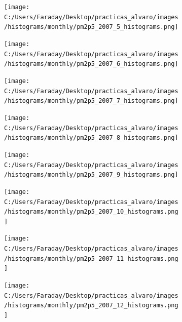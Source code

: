 \documentclass[12pt]{article}
\begin{document}
\begin{figure}[H]
\centering
\begin{subfigure}[h]{0.45\textwidth}
\texttt{[image: C:/Users/Faraday/Desktop/practicas\_alvaro/images/histograms/monthly/pm2p5\_2007\_5\_histograms.png]}
\caption{}
\label{fig:hist-mon-4-5-2007}
\end{subfigure}
%
\begin{subfigure}[H]{0.45\textwidth}
\texttt{[image: C:/Users/Faraday/Desktop/practicas\_alvaro/images/histograms/monthly/pm2p5\_2007\_6\_histograms.png]}
\caption{}
\label{fig:hist-mon-4-6-2007}
\end{subfigure}
\caption{}
\end{figure}

\newpage

\begin{figure}[H]
\centering
\begin{subfigure}[h]{0.45\textwidth}
\texttt{[image: C:/Users/Faraday/Desktop/practicas\_alvaro/images/histograms/monthly/pm2p5\_2007\_7\_histograms.png]}
\caption{}
\label{fig:hist-mon-4-7-2007}
\end{subfigure}
%
\begin{subfigure}[H]{0.45\textwidth}
\texttt{[image: C:/Users/Faraday/Desktop/practicas\_alvaro/images/histograms/monthly/pm2p5\_2007\_8\_histograms.png]}
\caption{}
\label{fig:hist-mon-4-8-2007}
\end{subfigure}
\caption{}
\end{figure}

\begin{figure}[H]
\centering
\begin{subfigure}[h]{0.45\textwidth}
\texttt{[image: C:/Users/Faraday/Desktop/practicas\_alvaro/images/histograms/monthly/pm2p5\_2007\_9\_histograms.png]}
\caption{}
\label{fig:hist-mon-4-9-2007}
\end{subfigure}
%
\begin{subfigure}[H]{0.45\textwidth}
\texttt{[image: C:/Users/Faraday/Desktop/practicas\_alvaro/images/histograms/monthly/pm2p5\_2007\_10\_histograms.png]}
\caption{}
\label{fig:hist-mon-4-10-2007}
\end{subfigure}
\caption{}
\end{figure}

\begin{figure}[H]
\centering
\begin{subfigure}[h]{0.45\textwidth}
\texttt{[image: C:/Users/Faraday/Desktop/practicas\_alvaro/images/histograms/monthly/pm2p5\_2007\_11\_histograms.png]}
\caption{}
\label{fig:hist-mon-4-11-2007}
\end{subfigure}
%
\begin{subfigure}[H]{0.45\textwidth}
\texttt{[image: C:/Users/Faraday/Desktop/practicas\_alvaro/images/histograms/monthly/pm2p5\_2007\_12\_histograms.png]}
\caption{}
\label{fig:hist-mon-4-12-2007}
\end{subfigure}
\caption{}
\end{figure}
\end{document}
